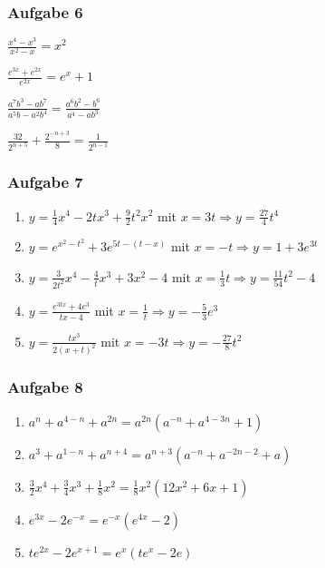 \subsubsection{Aufgabe 6}
\begin{enumerate}
\begin{multicols}{2}
	\item \quad $ \frac{x^4-x^3}{x^2-x}=x^2 $													%
	\item \quad $ \frac{e^{3x}+e^{2x}}{e^{2x}}=e^x + 1 $											%
	\item \quad $ \frac{a^7b^3-ab^7}{a^5b-a^2b^4}=\frac{a^6b^2-b^6}{a^4-ab^3} $	%
	\item \quad $ \frac{32}{2^{n+5}} + \frac{2^{-n+3}}{8}=\frac{1}{2^{n-1}} $						%
\end{multicols} 
\end{enumerate}

\subsubsection{Aufgabe 7}
\begin{enumerate}
	\item \quad $ y = \frac{1}{4}x^4-2tx^3+\frac{9}{2}t^2x^2 $ mit $ x = 3t \Rightarrow y = \frac{27}{4}t^4 $					%
	\item \quad $ y = e^{x^2-t^2}+3e^{5t-(t-x)} $ mit $ x = -t \Rightarrow y = 1 + 3e^{3t} $							%
	\item \quad $ y = \frac{3}{2t^2}x^4 - \frac{4}{t}x^3 + 3x^2 - 4 $ mit $ x = \frac{1}{3}t \Rightarrow y = \frac{11}{54}t^2 - 4 $		%
	\item \quad $ y = \frac{e^{3tx}+4e^3}{tx-4} $ mit $ x = \frac{1}{t} \Rightarrow y = -\frac{5}{3}e^3 $					%
	\item \quad $ y = \frac{tx^3}{2(x+t)^2} $ mit $x = -3t \Rightarrow y = -\frac{27}{8}t^2 $				%
\end{enumerate}

\subsubsection{Aufgabe 8} 
\begin{enumerate}
	\item \quad $ a^n+a^{4-n}+a^{2n} = a^{2n}(a^{-n}+a^{4-3n}+1) $				%
	\item \quad $ a^3 + a^{1-n} + a^{n+4} = a^{n+3}(a^{-n}+a^{-2n-2}+a) $			%
	\item \quad $ \frac{3}{2}x^4+\frac{3}{4}x^3+\frac{1}{8}x^2 = \frac{1}{8}x^2(12x^2+6x+1) $			%
	\item \quad $ e^{3x}-2e^{-x} = e^{-x}(e^{4x}-2) $								%
	\item \quad $ te^{2x}-2e^{x+1} = e^x(te^x-2e) $										%
\end{enumerate}

